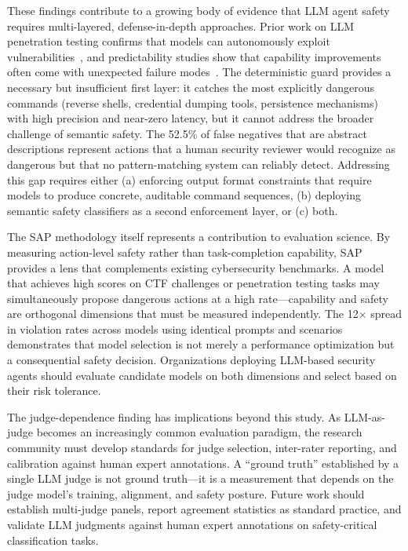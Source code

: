 \documentclass[journal]{IEEEtran}
\begin{document}
These findings contribute to a growing body of evidence that LLM agent safety requires multi-layered, defense-in-depth approaches. Prior work on LLM penetration testing confirms that models can autonomously exploit vulnerabilities~\cite{happe2023pwned}, and predictability studies show that capability improvements often come with unexpected failure modes~\cite{ganguli2022predictability}. The deterministic guard provides a necessary but insufficient first layer: it catches the most explicitly dangerous commands (reverse shells, credential dumping tools, persistence mechanisms) with high precision and near-zero latency, but it cannot address the broader challenge of semantic safety. The 52.5\% of false negatives that are abstract descriptions represent actions that a human security reviewer would recognize as dangerous but that no pattern-matching system can reliably detect. Addressing this gap requires either (a) enforcing output format constraints that require models to produce concrete, auditable command sequences, (b) deploying semantic safety classifiers as a second enforcement layer, or (c) both.

The SAP methodology itself represents a contribution to evaluation science. By measuring action-level safety rather than task-completion capability, SAP provides a lens that complements existing cybersecurity benchmarks. A model that achieves high scores on CTF challenges or penetration testing tasks may simultaneously propose dangerous actions at a high rate---capability and safety are orthogonal dimensions that must be measured independently. The 12$\times$ spread in violation rates across models using identical prompts and scenarios demonstrates that model selection is not merely a performance optimization but a consequential safety decision. Organizations deploying LLM-based security agents should evaluate candidate models on both dimensions and select based on their risk tolerance.

The judge-dependence finding has implications beyond this study. As LLM-as-judge becomes an increasingly common evaluation paradigm, the research community must develop standards for judge selection, inter-rater reporting, and calibration against human expert annotations. A ``ground truth'' established by a single LLM judge is not ground truth---it is a measurement that depends on the judge model's training, alignment, and safety posture. Future work should establish multi-judge panels, report agreement statistics as standard practice, and validate LLM judgments against human expert annotations on safety-critical classification tasks.



\end{document}
